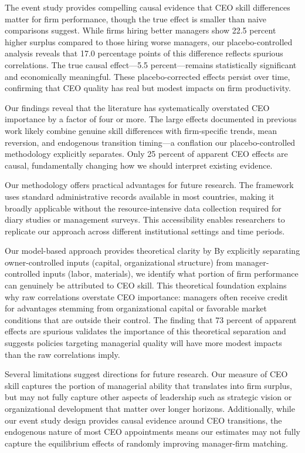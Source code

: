 \documentclass[11pt,a4paper]{article}
\begin{document}
The event study provides compelling causal evidence that CEO skill differences matter for firm performance, though the true effect is smaller than naive comparisons suggest. While firms hiring better managers show 22.5 percent higher surplus compared to those hiring worse managers, our placebo-controlled analysis reveals that 17.0 percentage points of this difference reflects spurious correlations. The true causal effect---5.5 percent---remains statistically significant and economically meaningful. These placebo-corrected effects persist over time, confirming that CEO quality has real but modest impacts on firm productivity.

Our findings reveal that the literature has systematically overstated CEO importance by a factor of four or more. The large effects documented in previous work likely combine genuine skill differences with firm-specific trends, mean reversion, and endogenous transition timing---a conflation our placebo-controlled methodology explicitly separates. Only 25 percent of apparent CEO effects are causal, fundamentally changing how we should interpret existing evidence.

Our methodology offers practical advantages for future research. The framework uses standard administrative records available in most countries, making it broadly applicable without the resource-intensive data collection required for diary studies or management surveys. This accessibility enables researchers to replicate our approach across different institutional settings and time periods.

Our model-based approach provides theoretical clarity by By explicitly separating owner-controlled inputs (capital, organizational structure) from manager-controlled inputs (labor, materials), we identify what portion of firm performance can genuinely be attributed to CEO skill. This theoretical foundation explains why raw correlations overstate CEO importance: managers often receive credit for advantages stemming from organizational capital or favorable market conditions that are outside their control. The finding that 73 percent of apparent effects are spurious validates the importance of this theoretical separation and suggests policies targeting managerial quality will have more modest impacts than the raw correlations imply.

Several limitations suggest directions for future research. Our measure of CEO skill captures the portion of managerial ability that translates into firm surplus, but may not fully capture other aspects of leadership such as strategic vision or organizational development that matter over longer horizons. Additionally, while our event study design provides causal evidence around CEO transitions, the endogenous nature of most CEO appointments means our estimates may not fully capture the equilibrium effects of randomly improving manager-firm matching.
\end{document}
